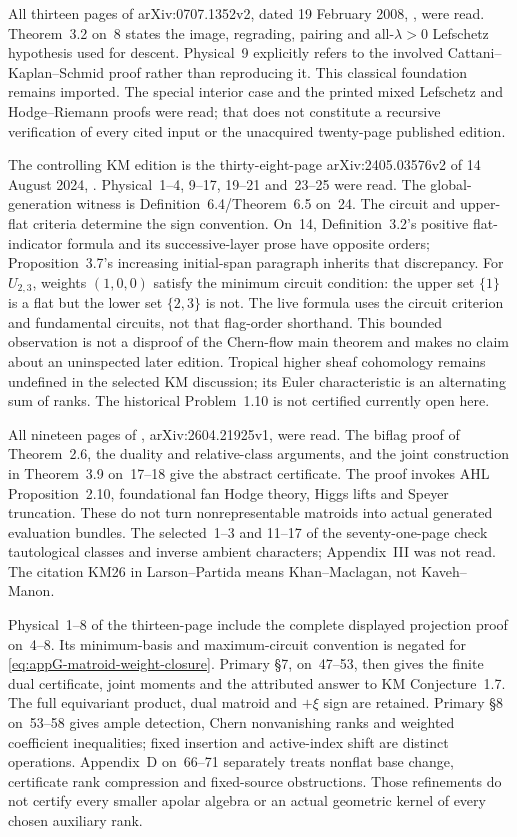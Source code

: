 All thirteen pages of arXiv:0707.1352v2, dated 19 February 2008,
\cite{Cattani08MixedLefschetzV2}, were read. Theorem~3.2 on~8
states the image, regrading, pairing and all-$\lambda>0$
Lefschetz hypothesis used for descent. Physical~9 explicitly
refers to the involved Cattani--Kaplan--Schmid proof rather than
reproducing it. This classical foundation remains imported.
The special interior case and the printed mixed Lefschetz and
Hodge--Riemann proofs were read; that does not constitute a
recursive verification of every cited input or the unacquired
twenty-page published edition.

The controlling KM edition is the thirty-eight-page
arXiv:2405.03576v2 of 14 August 2024,
\cite{KavehManon24TropicalBundlesV2}. Physical~1--4, 9--17,
19--21 and~23--25 were read. The global-generation witness is
Definition~6.4/Theorem~6.5 on~24. The circuit and upper-flat
criteria determine the sign convention. On~14, Definition~3.2's
positive flat-indicator formula and its successive-layer prose
have opposite orders; Proposition~3.7's increasing initial-span
paragraph inherits that discrepancy. For $U_{2,3}$, weights
$(1,0,0)$ satisfy the minimum circuit condition: the upper set
$\{1\}$ is a flat but the lower set $\{2,3\}$ is not.
The live formula uses the circuit criterion and fundamental
circuits, not that flag-order shorthand. This bounded observation
is not a disproof of the Chern-flow main theorem and makes no
claim about an uninspected later edition. Tropical higher sheaf
cohomology remains undefined in the selected KM discussion;
its Euler characteristic is an alternating sum of ranks.
The historical Problem~1.10 is not certified currently open here.

All nineteen pages of
\cite{LarsonPartida26ProjectiveBundlesV1}, arXiv:2604.21925v1,
were read. The biflag proof of Theorem~2.6, the duality and
relative-class arguments, and the joint construction in Theorem~3.9
on~17--18 give the abstract certificate. The proof invokes AHL
Proposition~2.10, foundational fan Hodge theory, Higgs lifts and
Speyer truncation. These do not turn nonrepresentable matroids
into actual generated evaluation bundles. The selected~1--3 and
11--17 of the seventy-one-page
\cite{BergetEurSpinkTseng23TautologicalV4} check tautological
classes and inverse ambient characters; Appendix~III was not read.
The citation KM26 in Larson--Partida means Khan--Maclagan,
not Kaveh--Manon.

Physical~1--8 of the thirteen-page
\cite{Ardila04UltrametricsV1} include the complete displayed
projection proof on~4--8. Its minimum-basis and maximum-circuit
convention is negated for \eqref{eq:appG-matroid-weight-closure}.
Primary \S7, on~47--53, then gives the finite dual certificate,
joint moments and the attributed answer to KM Conjecture~1.7.
The full equivariant product, dual matroid and $+\xi$ sign are
retained. Primary \S8 on~53--58 gives ample detection,
Chern nonvanishing ranks and weighted coefficient inequalities;
fixed insertion and active-index shift are distinct operations.
Appendix~D on~66--71 separately treats nonflat base change,
certificate rank compression and fixed-source obstructions.
Those refinements do not certify every smaller apolar algebra
or an actual geometric kernel of every chosen auxiliary rank.

